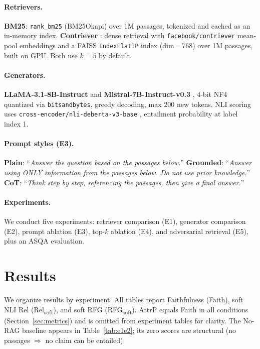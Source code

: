 \documentclass[11pt]{article}
\begin{document}
\paragraph{Retrievers.}
\textbf{BM25}: \texttt{rank\_bm25} (BM25Okapi) over 1M passages,
tokenized and cached as an in-memory index.
\textbf{Contriever} \cite{izacard2021unsupervised}: dense retrieval with
\texttt{facebook/contriever} mean-pool embeddings and a FAISS
\texttt{IndexFlatIP} index (dim\,=\,768) over 1M passages, built on GPU.
Both use $k{=}5$ by default.

\paragraph{Generators.}
\textbf{LLaMA-3.1-8B-Instruct} \cite{touvron2023llama} and
\textbf{Mistral-7B-Instruct-v0.3} \cite{jiang2023mistral7b},
4-bit NF4 quantized via \texttt{bitsandbytes}, greedy decoding,
max 200 new tokens.
NLI scoring uses \texttt{cross-encoder/nli-deberta-v3-base}
\cite{he2020deberta}, entailment probability at label index 1.

\paragraph{Prompt styles (E3).}
\textbf{Plain}: ``\textit{Answer the question based on the passages below.}''
\textbf{Grounded}: ``\textit{Answer using ONLY information from the passages
below. Do not use prior knowledge.}''
\textbf{CoT}: ``\textit{Think step by step, referencing the passages,
then give a final answer.}''

\paragraph{Experiments.}
We conduct five experiments: retriever comparison (E1), generator comparison (E2), prompt ablation (E3), top-$k$ ablation (E4), and adversarial retrieval (E5), plus an ASQA evaluation.

\section{Results}

We organize results by experiment.
All tables report Faithfulness (Faith), soft NLI Rel
(Rel\textsubscript{soft}), and soft RFG (RFG\textsubscript{soft}).
AttrP equals Faith in all conditions (Section~\ref{sec:metrics})
and is omitted from experiment tables for clarity.
The No-RAG baseline appears in Table~\ref{tab:e1e2};
its zero scores are structural (no passages $\Rightarrow$ no claim
can be entailed).
\end{document}
